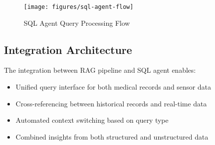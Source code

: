 \begin{figure}[!t]
\centering
\texttt{[image: figures/sql-agent-flow]}
\caption{SQL Agent Query Processing Flow}
\label{fig:sql-agent-flow}
\end{figure}

\subsection{Integration Architecture}
The integration between RAG pipeline and SQL agent enables:

\begin{itemize}
\item Unified query interface for both medical records and sensor data
\item Cross-referencing between historical records and real-time data
\item Automated context switching based on query type
\item Combined insights from both structured and unstructured data
\end{itemize} 